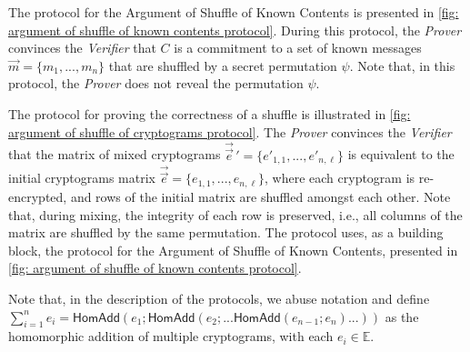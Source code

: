 The protocol for the Argument of Shuffle of Known Contents is presented in \cref{fig: argument of shuffle of known contents protocol}. During this protocol, the \textit{Prover} convinces the \textit{Verifier} that $C$ is a commitment to a set of known messages $\vec{m} = \{ m_1, ..., m_n \}$ that are shuffled by a secret permutation $\psi$. Note that, in this protocol, the \textit{Prover} does not reveal the permutation $\psi$.

The protocol for proving the correctness of a shuffle is illustrated in \cref{fig: argument of shuffle of cryptograms protocol}. The \textit{Prover} convinces the \textit{Verifier} that the matrix of mixed cryptograms $\vec{\vec{e}}\,' = \{ e'_{1, 1}, ..., e'_{n, \ell} \}$ is equivalent to the initial cryptograms matrix $\vec{\vec{e}} = \{ e_{1, 1}, ..., e_{n, \ell} \}$, where each cryptogram is re-encrypted, and rows of the initial matrix are shuffled amongst each other. Note that, during mixing, the integrity of each row is preserved, i.e., all columns of the matrix are shuffled by the same permutation. The protocol uses, as a building block, the protocol for the Argument of Shuffle of Known Contents, presented in \cref{fig: argument of shuffle of known contents protocol}.

Note that, in the description of the protocols, we abuse notation and define $\sum_{i=1}^n e_i = \mathsf{HomAdd}(e_1; \mathsf{HomAdd}(e_2; ... \mathsf{HomAdd}(e_{n-1}; e_n) ... ))$ as the homomorphic addition of multiple cryptograms, with each $e_i \in \mathbb{E}$.

